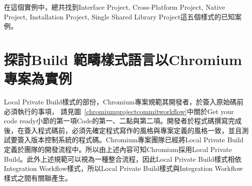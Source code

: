 
在這個實例中，總共找到Interface Project, Cross-Platform Project, Native Project, Installation Project, Single Shared Library Project這五個樣式的已知案例。




\section{探討Build 範疇樣式語言以Chromium專案為實例}

Local Private Build樣式的部份，Chromium專案規範其開發者，於簽入原始碼前必須執行的事項，
請見圖~\ref{chromiumprojectcommitworkflow}中關於Get your code ready小節的第一項Code的第一、二點與第二項\cite{chromiumcontributingcode}。開發者於程式碼撰寫完成後，在簽入程式碼前，必須先確定程式寫作的風格與專案定義的風格一致，並且測試要簽入版本控制系統的程式碼。Chromium專案團隊已經將Local Private Build定義於團隊的開發流程中。所以由上述內容可知Chromium採用Local Private Build。此外上述規範可以視為一種整合流程，因此Local Private Build樣式相依Integration Workflow樣式，所以Local Private Build樣式與Integration Workflow樣式之間有關聯產生。

